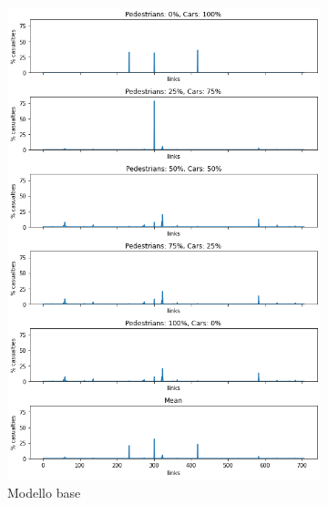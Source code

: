 \begin{figure}[ht]
    \centering
    \begin{subfigure}{0.475\textwidth}
        \centering
        \includegraphics[width=\textwidth]{images/analisi/base_links_casualties}
        \caption{Modello base}
        \label{fig:base-link-casualties}
    \end{subfigure}
    \hfill
    \begin{subfigure}{0.475\textwidth}
        \centering

\end{subfigure}
\end{figure}
